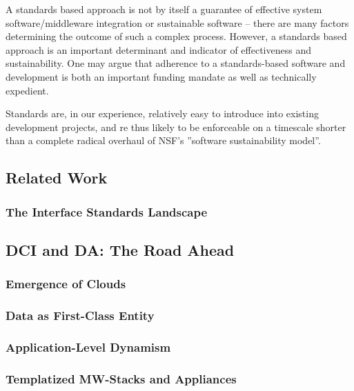 \documentclass[a4paper,12pt]{article}
\begin{document}
A standards based approach is not by itself a guarantee of effective
system software/middleware integration or sustainable software --
there are many factors determining the outcome of such a complex
process. However, a standards based approach is an important
determinant and indicator of effectiveness and sustainability.  One
may argue that adherence to a standards-based software and development
is both an important funding mandate as well as technically expedient.  

Standards are, in our experience, relatively easy to introduce into
 existing development projects, and re thus likely to be enforceable
 on a timescale shorter than a complete radical overhaul of NSF’s
 ''software sustainability model''.

\subsection{Related Work}

\subsubsection{The Interface Standards Landscape}\label{interface_landscape}

\subsection{DCI and DA: The Road Ahead}

\subsubsection{Emergence of Clouds}

\subsubsection{Data as First-Class Entity}

\subsubsection{Application-Level Dynamism}

\subsubsection{Templatized MW-Stacks and Appliances}

 

\end{document}
